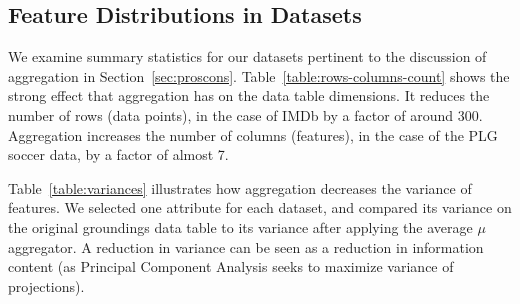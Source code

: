 \documentclass[conference]{IEEEtran}
\begin{document}
\subsection{Feature Distributions in Datasets}

We examine summary statistics for our datasets pertinent to the discussion of aggregation in Section~\ref{sec:proscons}. Table~\ref{table:rows-columns-count} shows the strong effect that aggregation has on the data table dimensions. It reduces the number of rows (data points), in the case of IMDb by a factor of around 300. Aggregation increases the number of columns (features), in the case of the PLG soccer data, by a factor of almost 7.

\begin{table}[ht]
\caption{Data Table Dimensions}
\centering
{}
\label{table:rows-columns-count}
\end{table}

Table~\ref{table:variances} illustrates how aggregation decreases the variance of features. We selected one attribute for each dataset, and compared its variance on the original groundings data table to its variance after applying the average $\mu$ aggregator. A reduction in variance can be seen as a reduction in information content (as Principal Component Analysis seeks to maximize variance of projections).
\end{document}
